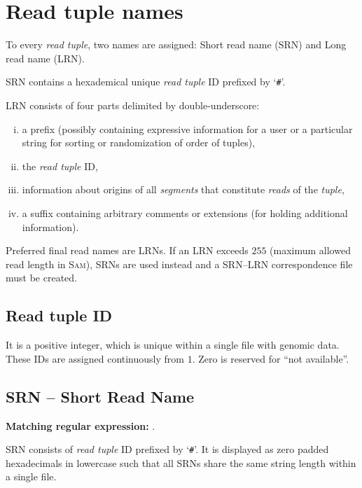 \documentclass[10pt,a4paper]{article}
\newcommand{\re}[1]{\framebox{\mbox{\texttt{#1}}}}
\newcommand{\mre}[1]{\hspace{0.5cm}\textbf{Matching regular expression:} \re{#1}\smallskip}
\newcommand{\SAM}{\textsc{Sam}}
\begin{document}

\section{Read tuple names}

To every {\em read tuple}, two names are assigned: {Short read name} ({SRN}) and {Long read name} ({LRN}).

\medskip

{SRN} contains a hexademical unique {\em read tuple} ID prefixed by `\texttt{\#}'.

\medskip

{LRN} consists of
four parts delimited by double-underscore:
\begin{enumerate}[i)]
	\item a prefix (possibly containing expressive 
information for a user or a particular string
for sorting or randomization of order of tuples),
	\item the {\em read tuple} ID,
	\item information about origins of all {\em segments} that constitute {\em reads} of the {\em tuple},
	\item a suffix containing arbitrary comments or extensions (for holding additional information).
\end{enumerate}


\medskip

Preferred final read names are {LRNs}. If an {LRN} exceeds $255$ (maximum allowed read length in 
\SAM \cite{samtools}), 
{SRNs} are used instead and a SRN--LRN correspondence file must be created. 




\subsection{Read tuple ID}

It is a positive integer, which is unique within a single file with genomic data.
These IDs are assigned continuously from $1$. Zero is reserved for ``not available''.



\subsection{SRN -- Short Read Name}
\mre{\char92\char35([0-9a-f]+)}.

{SRN} consists of {\em read tuple} ID prefixed by
`\texttt{\#}'.
It is displayed as zero padded hexadecimals in lowercase such 
that all {SRN}s share the same string
length within a single file.
\end{document}
